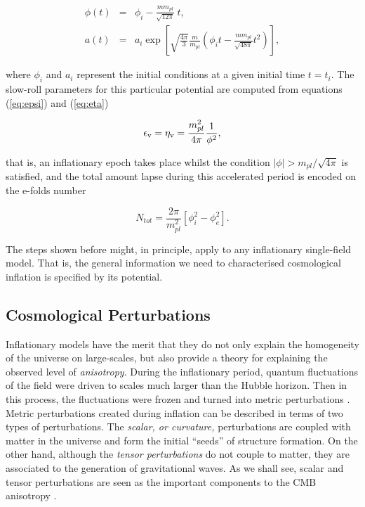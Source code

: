\documentclass{rmaa}
\def\beq{\begin{equation}}
\def\eeq{\end{equation}}
\def\bea{\begin{eqnarray}}
\def\eea{\end{eqnarray}}
\begin{document}
\bea
\phi(t)&=&\phi_i - \frac{m m_{pl}}{\sqrt{12 \pi}}~t,\\
a(t)&=& a_i \exp\left[\sqrt{\frac{4\pi}{3}}\frac{m}{m_{pl}}\left( \phi_i t - \frac{m m_{pl}}{\sqrt{48 \pi}}t^2 \right) \right], \nonumber
\eea

\noindent
where $\phi_i$ and $a_i$ represent the initial conditions at a given initial time $t=t_i$.
The slow-roll parameters for this particular potential are computed from 
equations (\ref{eq:epsi}) and (\ref{eq:eta})

\beq
\epsilon_{\rm v}=\eta_{\rm v}= \frac{m_{pl}^2}{4\pi} \frac{1}{\phi^2}, 
\eeq

\noindent
that is, an inflationary epoch takes place whilst the condition $|\phi|> {m_{pl}}/\sqrt{4\pi}$ 
is satisfied, and the total amount lapse during this accelerated period is encoded on the e-folds number

\beq
N_{tot}= \frac{2\pi}{m_{pl}^2}\left[\phi^2_i - \phi^2_e \right].
\eeq 

The steps shown before might, in principle, apply to any inflationary single-field model. 
That is, the general information we need to characterised 
cosmological inflation is specified by its potential. 

 
\subsection{Cosmological Perturbations}

Inflationary models have the merit that they do not only explain the 
 homogeneity of the universe on large-scales,
but also provide a theory  for explaining the observed level of {\em
anisotropy}. During the inflationary period, quantum fluctuations of the field 
were driven to scales much larger than the Hubble horizon. Then in this process, the fluctuations
were frozen and turned into metric perturbations \citep{Mukhanov}. 
%
Metric perturbations created during inflation can be described in terms of two types of perturbations.
The {\it scalar, or curvature,} perturbations are coupled with matter in the
universe and form the initial ``seeds'' of structure formation. On the other hand, although the 
{\it tensor perturbations} do not couple to matter, they are associated
to the generation of gravitational waves.
As we shall see, scalar and tensor perturbations are seen as the important components to 
 the CMB anisotropy \citep{Hu}. 
\\
\end{document}
